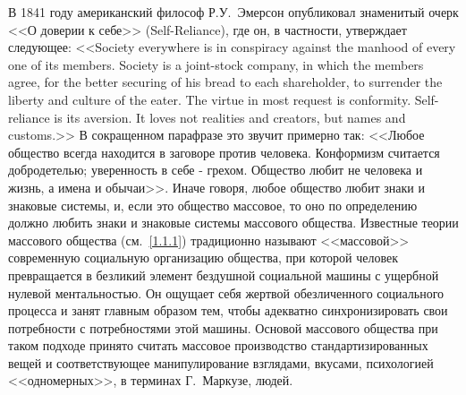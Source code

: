 В 1841 году американский философ Р.У.~Эмерсон опубликовал знаменитый очерк <<О доверии к себе>> (Self-Reliance),
где он, в частности, утверждает следующее: <<Society everywhere is in conspiracy against the manhood of
every one of its members. Society is a joint-stock company, in which the members agree, for
the better securing of his bread to each shareholder, to surrender the liberty and culture of the eater.
The virtue in most request is conformity. Self-reliance is its aversion. It loves not realities and
creators, but names and customs.>>\autocite{emerson1972self} В сокращенном парафразе это звучит примерно
так: <<Любое общество всегда находится в заговоре против человека. Конформизм считается добродетелью;
уверенность в себе - грехом. Общество любит не человека и жизнь, а имена и обычаи>>. Иначе говоря,
любое общество любит знаки и знаковые системы, и, если это общество массовое, то оно по определению
должно любить знаки и знаковые системы массового общества.
Известные теории массового общества (см.~\ref{1.1.1}) традиционно называют <<массовой>>
современную социальную организацию общества, при которой человек превращается в безликий
элемент бездушной социальной машины с ущербной нулевой ментальностью. Он ощущает себя жертвой
обезличенного социального процесса и занят главным образом тем, чтобы адекватно синхронизировать
свои потребности с потребностями этой машины. Основой массового общества при таком подходе принято
считать массовое производство стандартизированных вещей и соответствующее манипулирование взглядами,
вкусами, психологией <<одномерных>>, в терминах Г.~Маркузе, людей.

